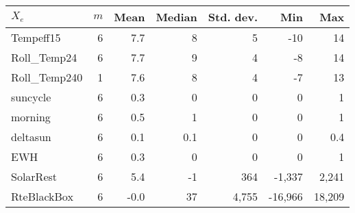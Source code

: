 \begin{center}
\begin{tabular}{lrrrrrr}
 $X_e$ & $m$  & Mean  & Median  & Std. dev.  & Min  & Max  \\
  \midrule 
Tempeff15 &         6 &       7.7 &         8 &         5 &       -10 &        14 \\  
Roll\_Temp24 &       6 &       7.7 &         9 &         4 &        -8 &        14 \\  
Roll\_Temp240 &       1 &       7.6 &         8 &         4 &        -7 &        13 \\  
suncycle &         6 &       0.3 &         0 &         0 &         0 &         1 \\  
morning &         6 &       0.5 &         1 &         0 &         0 &         1 \\  
deltasun &         6 &       0.1 &         0.1 &         0 &         0 &         0.4 \\  
EWH &         6 &       0.3 &         0 &         0 &         0 &         1 \\  
SolarRest &         6 &       5.4 &        -1 &       364 &    -1,337 &     2,241 \\  
RteBlackBox &         6 &      -0.0 &        37 &     4,755 &   -16,966 &    18,209 \\  
\bottomrule 
\end{tabular} 
\end{center}
